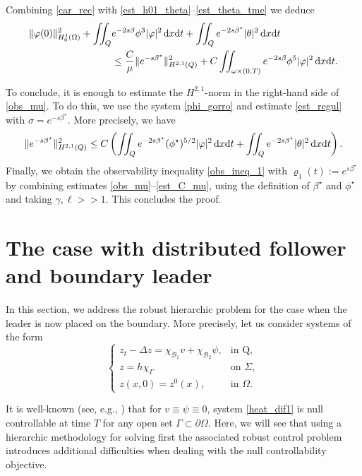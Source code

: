 \documentclass[preprint,10pt]{article}
\numberwithin{equation}{section}
\numberwithin{theorem}{section}
\def\dx{\,\textnormal{d}x}
\def\dt{\textnormal{d}t}
\def\cbd{\Gamma}
\newcommand\csin[1]{\chi_{#1}}
\def\dx{\,\textnormal{d}x}
\def\dt{\textnormal{d}t}
\begin{document}
{Combining \eqref{car_rec} with \eqref{est_h01_theta}--\eqref{est_theta_tme} we deduce
%
\begin{equation}\label{obs_mu}
\begin{split}
\|\varphi(0)\|_{H_0^1(\Omega)}^2+\iint_{Q}&e^{-2s\beta}\phi^3|\varphi|^2\dx\dt+\iint_{Q}e^{-2s\beta^*}|\theta|^2\dx\dt \\
&\leq \frac{C}{\mu}\|e^{-s\beta^*}\|_{H^{2,1}(Q)}^2+ C\iint_{\omega\times(0,T)}e^{-2s\beta}\phi^5|\varphi|^2\dx\dt.
\end{split}
\end{equation}
%

To conclude, it is enough to estimate the $H^{2,1}$-norm in the right-hand side of \eqref{obs_mu}. To do this, we use the system \eqref{phi_gorro} and estimate \eqref{est_regul} with $\sigma=e^{-s\beta^\star}$. More precisely, we have 
%
\begin{equation}\label{est_C_mu}
\|e^{-s\beta^\star}\|^2_{H^{2,1}(Q)}\leq C\left(\iint_{Q}e^{-2s\beta^\star}(\phi^\star)^{5/2}|\varphi|^2\dx\dt+\iint_{Q}e^{-2s\beta^\star}|\theta|^2\dx\dt\right).
\end{equation}
%
Finally, we obtain the observability inequality \eqref{obs_ineq_1} with $\varrho_1(t):=e^{s\beta^\star}$ by combining estimates \eqref{obs_mu}--\eqref{est_C_mu}, using the definition of $\beta^\star$ and $\phi^\star$ and taking $\gamma,\ell>>1$. This concludes the proof. 

\section{The case with distributed follower and boundary leader}\label{sec_bound_leader}

In this section, we address the robust hierarchic problem for the case when the leader is now placed on the boundary. More precisely, let us consider systems of the form
%
\begin{equation}\label{heat_dif1}
\begin{cases}
z_t-\Delta z=\csin{\mathcal B_1}v+\csin{\mathcal B_2}\psi, & \text{in Q}, \\
z=h\chi_{\cbd} &\text{on } \Sigma, \\
z(x,0)=z^0(x), & \text{in } \Omega.
\end{cases}
\end{equation}

It is well-known (see, e.g., \cite{ima_original,cara_guerrero}) that for $v\equiv\psi\equiv 0$, system \eqref{heat_dif1} is null controllable at time $T$ for any open set $\Gamma\subset\partial \Omega$. Here, we will see that using a hierarchic methodology for solving first the associated robust control problem introduces additional difficulties when dealing with the null controllability objective. 

}
\end{document}
